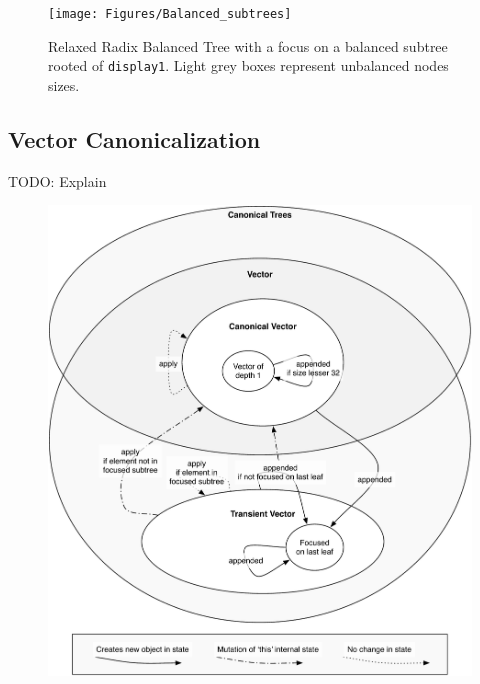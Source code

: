 \begin{figure}[h!]
  \centering
  \texttt{[image: Figures/Balanced\_subtrees]}
  \caption{Relaxed Radix Balanced Tree with a focus on a balanced subtree rooted of \texttt{display1}. Light grey boxes represent unbalanced nodes sizes.}
  \label{Balanced_subtrees}
\end{figure}


\subsection{Vector Canonicalization}
\label{VectorCanonicalization}
\color{red} TODO: Explain \color{black}

\begin{figure}[h!]
  \centering
  \includegraphics[width=\textwidth]{Figures/StatesGraphSimple}
  \caption{}
  \label{StatesGraphSimple}
\end{figure}


